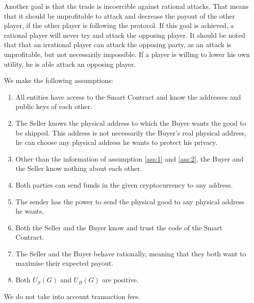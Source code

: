 \documentclass{cacthesis}
\begin{document}
Another goal is that the trade is incoercible against rational attacks. That means that it should be unprofitable to attack and decrease the payout of the other player, if the other player is following the protocol. If this goal is achieved, a rational player will never try and attack the opposing player. It should be noted that that an irrational player can attack the opposing party, as an attack is unprofitable, but not necessarily impossible. If a player is willing to lower his own utility, he is able attack an opposing player. \newline

We make the following assumptions:
\begin{enumerate}
    \item All entities have access to the Smart Contract and know the addresses and public keys of each other.
    \label{ass:1}
    \item The Seller knows the physical address to which the Buyer wants the good to be shipped. This address is not necessarily the Buyer's real physical address, he can choose any physical address he wants to protect his privacy.
    \label{ass:2}
    \item Other than the information of assumption \ref{ass:1} and \ref{ass:2}, the Buyer and the Seller know nothing about each other.
    \label{ass:3}
    \item Both parties can send funds in the given cryptocurrency to any address.
    \label{ass:4}
    \item The sender has the power to send the physical good to any physical address he wants.
    \label{ass:5}
    \item Both the Seller and the Buyer know and trust the code of the Smart Contract.
    \label{ass:6}
    \item The Seller and the Buyer behave rationally, meaning that they both want to maximise their expected payout.
    \item Both $U_S(G)$ and $U_B(G)$ are positive. 
\end{enumerate}

We do not take into account transaction fees. 



\end{document}
